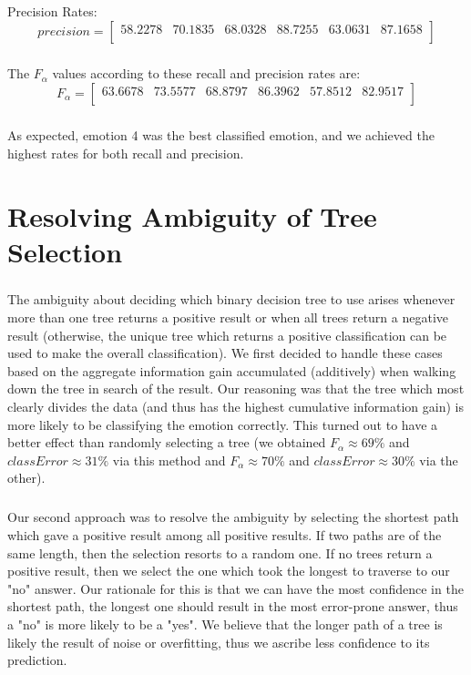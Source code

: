 \documentclass[a4paper,12pt,oneside,final]{report}
\begin{document}
\paragraph{}
Precision Rates:
\[
precision = \left[\begin{array}{cccccc}
58.2278 &  70.1835  & 68.0328  & 88.7255  & 63.0631 &  87.1658 \\
\end{array}
\right]
\]
\paragraph{}
The $F_{\alpha}$ values according to these recall and precision rates are: 
\[
F_{\alpha} = \left[\begin{array}{cccccc}
63.6678 &  73.5577 &  68.8797 &  86.3962 &  57.8512 &  82.9517 \\
\end{array}
\right]
\]
\paragraph{}
As expected, emotion 4 was the best classified emotion, and we achieved the highest rates for both recall and precision.

\chapter{Resolving Ambiguity of Tree Selection}
\paragraph{}
The ambiguity about deciding which binary decision tree to use arises whenever more than one tree returns a positive result or when all trees return a negative result (otherwise, the unique tree which returns a positive classification can be used to make the overall classification).  We first decided to handle these cases based on the aggregate information gain accumulated (additively) when walking down the tree in search of the result.  Our reasoning was that the tree which most clearly divides the data (and thus has the highest cumulative information gain) is more likely to be classifying the emotion correctly.  This turned out to have a better effect than randomly selecting a tree (we obtained $F_{\alpha} \approx 69\%$ and $classError \approx 31\%$ via this method and $F_{\alpha} \approx 70\%$ and $classError \approx 30\%$ via the other). 

\paragraph{}
Our second approach was to resolve the ambiguity by selecting the shortest path which gave a positive result among all positive results. If two paths are of the same length, then the selection resorts to a random one.  If no trees return a positive result, then we select the one which took the longest to traverse to our "no" answer.  Our rationale for this is that we can have the most confidence in the shortest path, the longest one should result in the most error-prone answer, thus a "no" is more likely to be a "yes".  We believe that the longer path of a tree is likely the result of noise or overfitting, thus we ascribe less confidence to its prediction.
\end{document}
